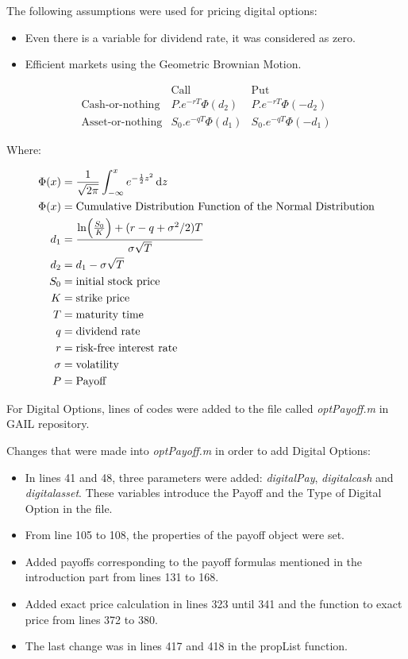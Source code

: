 \documentclass[]{elsarticle}
\theoremstyle{definition}
\theoremstyle{remark}
\begin{document}
The following assumptions were used for pricing digital options:
\begin{itemize}
\item Even there is a variable for dividend rate, it was considered as zero.
\item Efficient markets using the Geometric Brownian Motion.
\end{itemize}

$$\begin{array}{rcc}
& \text{Call}  & \text{Put} \\
\text{Cash-or-nothing} & P.e^{-rT}\Phi(d_2) & P.e^{-rT}\Phi(-d_2) \\
\text{Asset-or-nothing} & S_0.e^{-qT}\Phi(d_1) & S_0.e^{-qT}\Phi(-d_1)
\end{array}$$

Where:

\begin{align*}
\Phi(x) & =\frac{1}{\sqrt{2\pi}}\int_{-\infty}^{x}e^{-\frac{1}{2}z^2} \, 
{\rm
d}z \\
\Phi(x) & = \text{Cumulative Distribution Function of the Normal 
Distribution} \\ 
d_1 &=\frac{\ln \Bigl(\frac{S_0}{K} \Bigr)+(r-q+\sigma^2/2)T}
{\sigma\sqrt{T}} \\
d_2 &=d_1-\sigma\sqrt{T} \\
S_0 & = \text{initial stock price} \\
K & = \text{strike price}\\
T & = \text{maturity time}\\
q & = \text{dividend rate}\\
r & = \text{risk-free interest rate}\\
\sigma & = \text{volatility}\\
P & = \text{Payoff}\\
\end{align*}

For Digital Options, lines of codes were added to the file called \textit{optPayoff.m} in GAIL repository. 

Changes that were made into \textit{optPayoff.m} in order to add Digital Options:
\begin{itemize}
\item In lines 41 and 48, three parameters were added: \textit{digitalPay}, \textit{digitalcash} and \textit{digitalasset}. These variables introduce the Payoff and the Type of Digital Option in the file.
\item From line 105 to 108, the properties of the payoff object were set.
\item Added payoffs corresponding to the payoff formulas mentioned in the introduction part from lines 131 to 168.
\item Added exact price calculation in lines 323 until 341 and the function to exact price from lines 372 to 380.
\item The last change was in lines 417 and 418 in the propList function.
\end{itemize}
\end{document}
